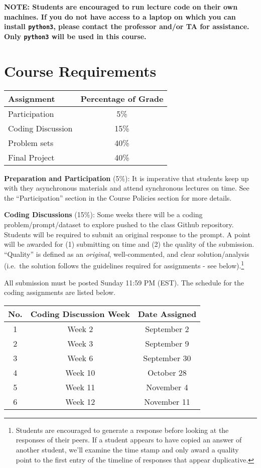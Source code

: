 \documentclass[
  12pt,
]{article}
\begin{document}
\textbf{NOTE: Students are encouraged to run lecture code on their own
machines. If you do not have access to a laptop on which you can install
\texttt{python3}, please contact the professor and/or TA for assistance.
Only \texttt{python3} will be used in this course.}

\hypertarget{course-requirements}{%
\section{Course Requirements}\label{course-requirements}}

\begin{longtable}[]{@{}lc@{}}
\toprule
\textbf{Assignment} & \textbf{Percentage of Grade}\tabularnewline
\midrule
\endhead
Participation & 5\%\tabularnewline
Coding Discussion & 15\%\tabularnewline
Problem sets & 40\%\tabularnewline
Final Project & 40\%\tabularnewline
\bottomrule
\end{longtable}

\textbf{Preparation and Participation} (5\%): It is imperative that
students keep up with they asynchronous materials and attend synchronous
lectures on time. See the ``Participation'' section in the Course
Policies section for more details.

\textbf{Coding Discussions} (15\%): Some weeks there will be a coding
problem/prompt/dataset to explore pushed to the class Github repository.
Students will be required to submit an original response to the prompt.
A point will be awarded for (1) submitting on time and (2) the quality
of the submission. ``Quality'' is defined as an \emph{original},
well-commented, and clear solution/analysis (i.e.~the solution follows
the guidelines required for assignments - see below).\footnote{Students
  are encouraged to generate a response before looking at the responses
  of their peers. If a student appears to have copied an answer of
  another student, we'll examine the time stamp and only award a quality
  point to the first entry of the timeline of responses that appear
  duplicative.}

All submission must be posted Sunday 11:59 PM (EST). The schedule for
the coding assignments are listed below.

\begin{longtable}[]{@{}ccc@{}}
\toprule
No. & Coding Discussion Week & Date Assigned\tabularnewline
\midrule
\endhead
1 & Week 2 & September 2\tabularnewline
2 & Week 3 & September 9\tabularnewline
3 & Week 6 & September 30\tabularnewline
4 & Week 10 & October 28\tabularnewline
5 & Week 11 & November 4\tabularnewline
6 & Week 12 & November 11\tabularnewline
\bottomrule
\end{longtable}
\end{document}
